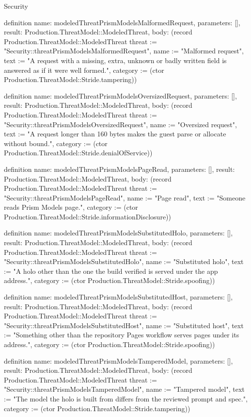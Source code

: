 \begin{lexlean}{Security}
\begin{semanticmodule}
definition{
  name: modeledThreatPrismModelsMalformedRequest,
  parameters: [],
  result: Production.ThreatModel::ModeledThreat,
  body: (record Production.ThreatModel::ModeledThreat {threat := "Security::threatPrismModelsMalformedRequest", name := "Malformed request", text := "A request with a missing, extra, unknown or badly written field is answered as if it were well formed.", category := (ctor Production.ThreatModel::Stride.tampering)})
}

definition{
  name: modeledThreatPrismModelsOversizedRequest,
  parameters: [],
  result: Production.ThreatModel::ModeledThreat,
  body: (record Production.ThreatModel::ModeledThreat {threat := "Security::threatPrismModelsOversizedRequest", name := "Oversized request", text := "A request longer than 160 bytes makes the guest parse or allocate without bound.", category := (ctor Production.ThreatModel::Stride.denialOfService)})
}

definition{
  name: modeledThreatPrismModelsPageRead,
  parameters: [],
  result: Production.ThreatModel::ModeledThreat,
  body: (record Production.ThreatModel::ModeledThreat {threat := "Security::threatPrismModelsPageRead", name := "Page read", text := "Someone reads Prism Models page.", category := (ctor Production.ThreatModel::Stride.informationDisclosure)})
}

definition{
  name: modeledThreatPrismModelsSubstitutedHolo,
  parameters: [],
  result: Production.ThreatModel::ModeledThreat,
  body: (record Production.ThreatModel::ModeledThreat {threat := "Security::threatPrismModelsSubstitutedHolo", name := "Substituted holo", text := "A holo other than the one the build verified is served under the app address.", category := (ctor Production.ThreatModel::Stride.spoofing)})
}

definition{
  name: modeledThreatPrismModelsSubstitutedHost,
  parameters: [],
  result: Production.ThreatModel::ModeledThreat,
  body: (record Production.ThreatModel::ModeledThreat {threat := "Security::threatPrismModelsSubstitutedHost", name := "Substituted host", text := "Something other than the repository Pages workflow serves pages under its address.", category := (ctor Production.ThreatModel::Stride.spoofing)})
}

definition{
  name: modeledThreatPrismModelsTamperedModel,
  parameters: [],
  result: Production.ThreatModel::ModeledThreat,
  body: (record Production.ThreatModel::ModeledThreat {threat := "Security::threatPrismModelsTamperedModel", name := "Tampered model", text := "The model the holo is built from differs from the reviewed prompt and spec.", category := (ctor Production.ThreatModel::Stride.tampering)})
}


\end{semanticmodule}
\end{lexlean}
